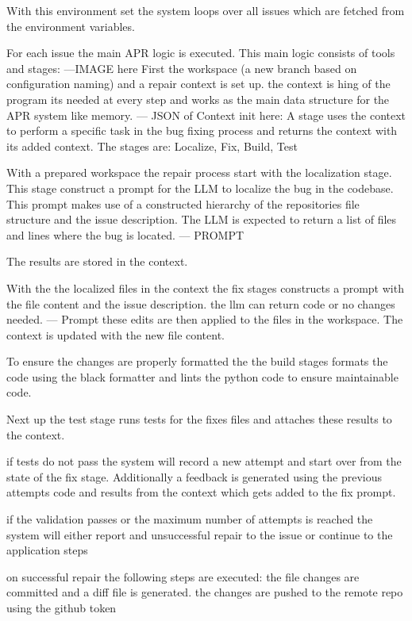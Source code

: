 With this environment set the system loops over all issues which are fetched from the environment variables.

For each issue the main APR logic is executed. This main logic consists of tools and stages:
---IMAGE here
First the workspace (a new branch based on configuration naming) and a repair context is set up. the context is hing of the program its needed at every step and works as the main data structure for the APR system like memory.
--- JSON of Context init here:
A stage uses the context to perform a specific task in the bug fixing process and returns the context with its added context. The stages are: Localize, Fix, Build, Test


With a prepared workspace the repair process start with the localization stage. This stage construct a prompt for the LLM to localize the bug in the codebase. This prompt makes use of a constructed hierarchy of the repositories file structure and the issue description. The LLM is expected to return a list of files and lines where the bug is located.
--- PROMPT

The results are stored in the context.

With the the localized files in the context the fix stages constructs a prompt with the file content and the issue description. the llm can return code or no changes needed.
--- Prompt
these edits are then applied to the files in the workspace. The context is updated with the new file content.

To ensure the changes are properly formatted the the build stages formats the code using the black formatter and lints the python code to ensure maintainable code.

Next up the test stage runs tests for the fixes files and attaches these results to the context.

if tests do not pass the system will record a new attempt and start over from the state of the fix stage. Additionally a feedback is generated using the previous attempts code and results from the context which gets added to the fix prompt.

if the validation passes or  the maximum number of attempts is reached the system will either report and unsuccessful repair to the issue or continue to the application steps

on successful repair the following steps are executed:
the file changes are committed and a diff file is generated.
the changes are pushed to the remote repo using the github token

